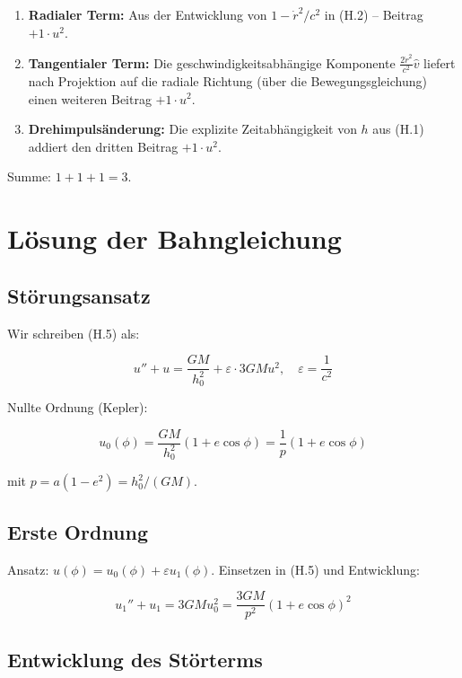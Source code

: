 \begin{enumerate}
    \item \textbf{Radialer Term:} Aus der Entwicklung von 
          \( 1 - \dot{r}^2/c^2 \) in (H.2) – Beitrag \( +1 \cdot u^2 \).
    \item \textbf{Tangentialer Term:} Die geschwindigkeitsabhängige 
          Komponente \( \frac{2\dot{r}^2}{c^2} \hat{v} \) liefert nach 
          Projektion auf die radiale Richtung (über die 
          Bewegungsgleichung) einen weiteren Beitrag \( +1 \cdot u^2 \).
    \item \textbf{Drehimpulsänderung:} Die explizite Zeitabhängigkeit 
          von \( h \) aus (H.1) addiert den dritten Beitrag \( +1 \cdot u^2 \).
\end{enumerate}

Summe: \( 1 + 1 + 1 = 3 \).

\section{Lösung der Bahngleichung}
\label{app:periheldrehung_loesung}

\subsection{Störungsansatz}
\label{sub:periheldrehung_stoerung}

Wir schreiben (H.5) als:

\[
u'' + u = \frac{GM}{h_0^2} + \varepsilon \cdot 3GM u^2, \quad \varepsilon = \frac{1}{c^2}
\]

Nullte Ordnung (Kepler):

\[
u_0(\phi) = \frac{GM}{h_0^2} (1 + e \cos \phi) = \frac{1}{p} (1 + e \cos \phi)
\]

mit \( p = a(1-e^2) = h_0^2/(GM) \).

\subsection{Erste Ordnung}
\label{sub:periheldrehung_erste_ordnung}

Ansatz: \( u(\phi) = u_0(\phi) + \varepsilon u_1(\phi) \). 
Einsetzen in (H.5) und Entwicklung:

\[
u_1'' + u_1 = 3GM u_0^2 = \frac{3GM}{p^2} (1 + e \cos \phi)^2
\]

\subsection{Entwicklung des Störterms}
\label{sub:periheldrehung_stoerterm}

